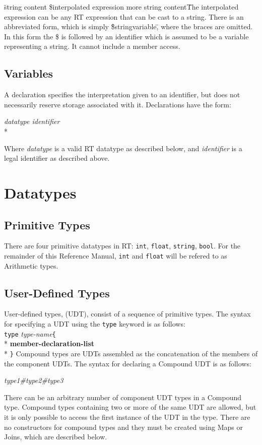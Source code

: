\"string content \${interpolated expression} more string content\"
The interpolated expression can be any RT expression that can be cast to a string.  There is an abbreviated
form, which is simply \"\$stringvariable\", where the braces are omitted.  In this form the \$ is followed
by an identifier which is assumed to be a variable representing a string.  It cannot include a member access.

\subsection{Variables}
A declaration specifies the interpretation given to an identifier, but does not necessarily
reserve storage associated with it.  Declarations have the form:
\begin{center}
\textsl{datatype identifier}\\*
\end{center}
Where \textsl{datatype} is a valid RT datatype as described below, and
\textsl{identifier} is a legal identifier as described above.


\section{Datatypes}

\subsection{Primitive Types}
There are four primitive datatypes in RT: \texttt{int}, \texttt{float}, \texttt{string}, \texttt{bool}. 
For the remainder of this Reference Manual, \texttt{int} and \texttt{float} will be refered to as 
Arithmetic types.

\subsection{User-Defined Types}
User-defined types, (UDT), consist of a sequence of primitive types. The syntax for specifying a 
UDT using the \texttt{type} keyword is as follows:\\
\hspace*{2.25 in}\texttt{type} \textsl{type-name}\texttt{\{}\\*
\hspace*{2.5 in}\textbf{member-declaration-list}\\*
\hspace*{2.25 in}\texttt{\}}
Compound types are UDTs assembled as the concatenation of the members of the component UDTs. The syntax
for declaring a Compound UDT is as follows:
\begin{center}
	\textsl{type1\#type2\#type3}
\end{center}
There can be an arbitrary number of component UDT types in a Compound type. Compound types containing two or more
of the same UDT are allowed, but it is only possible to access the first instance of the UDT in the type. There are
no constructors for compound types and they must be created using Maps or Joins, which are described below.


